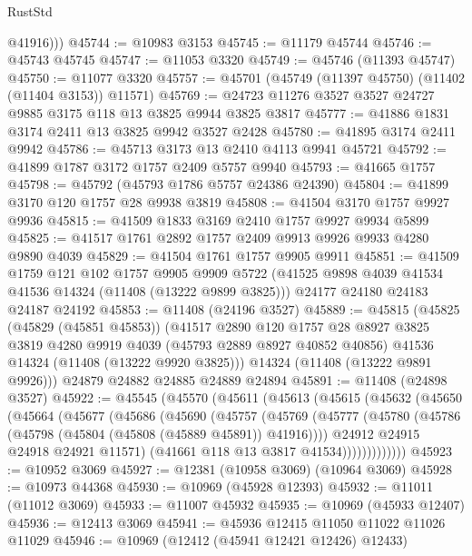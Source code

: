 \begin{lexlean}{RustStd}
\begin{coremodule}
          @41916)))
@45744 := @10983 @3153
@45745 := @11179 @45744
@45746 := @45743 @45745
@45747 := @11053 @3320
@45749 := @45746 (@11393 @45747)
@45750 := @11077 @3320
@45757 := @45701 (@45749 (@11397 @45750) (@11402 (@11404 @3153)) @11571)
@45769 := @24723 @11276 @3527 @3527 @24727 @9885 @3175 @118 @13 @3825 @9944 @3825 @3817
@45777 := @41886 @1831 @3174 @2411 @13 @3825 @9942 @3527 @2428
@45780 := @41895 @3174 @2411 @9942
@45786 := @45713 @3173 @13 @2410 @4113 @9941 @45721
@45792 := @41899 @1787 @3172 @1757 @2409 @5757 @9940
@45793 := @41665 @1757
@45798 := @45792 (@45793 @1786 @5757 @24386 @24390)
@45804 := @41899 @3170 @120 @1757 @28 @9938 @3819
@45808 := @41504 @3170 @1757 @9927 @9936
@45815 := @41509 @1833 @3169 @2410 @1757 @9927 @9934 @5899
@45825 := @41517 @1761 @2892 @1757 @2409 @9913 @9926 @9933 @4280 @9890 @4039
@45829 := @41504 @1761 @1757 @9905 @9911
@45851 := @41509
    @1759
    @121
    @102
    @1757
    @9905
    @9909
    @5722
    (@41525 @9898 @4039 @41534 @41536 @14324 (@11408 (@13222 @9899 @3825)))
    @24177
    @24180
    @24183
    @24187
    @24192
@45853 := @11408 (@24196 @3527)
@45889 := @45815
    (@45825
      (@45829 (@45851 @45853))
      (@41517
        @2890
        @120
        @1757
        @28
        @8927
        @3825
        @3819
        @4280
        @9919
        @4039
        (@45793 @2889 @8927 @40852 @40856)
        @41536
        @14324
        (@11408 (@13222 @9920 @3825)))
      @14324
      (@11408 (@13222 @9891 @9926)))
    @24879
    @24882
    @24885
    @24889
    @24894
@45891 := @11408 (@24898 @3527)
@45922 := @45545
    (@45570
      (@45611
        (@45613
          (@45615
            (@45632
              (@45650
                (@45664
                  (@45677
                    (@45686
                      (@45690
                        (@45757
                          (@45769
                            (@45777
                              (@45780 (@45786 (@45798 (@45804 (@45808 (@45889 @45891)) @41916))))
                              @24912
                              @24915
                              @24918
                              @24921
                              @11571)
                            (@41661 @118 @13 @3817 @41534)))))))))))))
@45923 := @10952 @3069
@45927 := @12381 (@10958 @3069) (@10964 @3069)
@45928 := @10973 @44368
@45930 := @10969 (@45928 @12393)
@45932 := @11011 (@11012 @3069)
@45933 := @11007 @45932
@45935 := @10969 (@45933 @12407)
@45936 := @12413 @3069
@45941 := @45936 @12415 @11050 @11022 @11026 @11029
@45946 := @10969 (@12412 (@45941 @12421 @12426) @12433)

\end{coremodule}
\end{lexlean}
